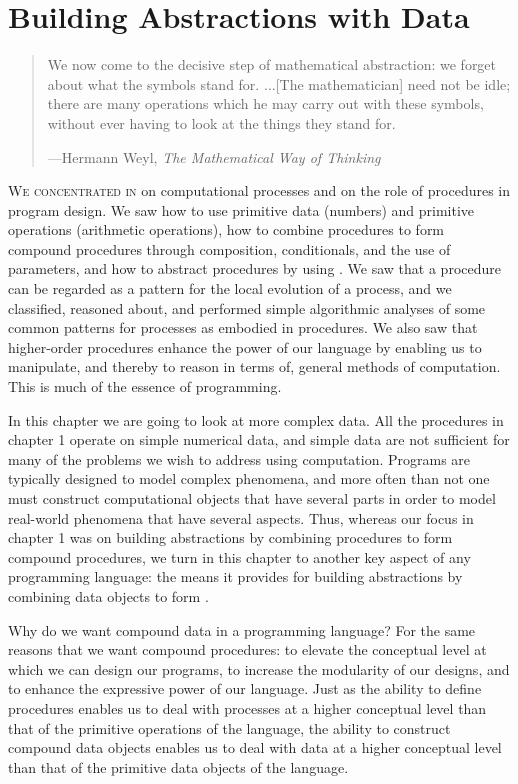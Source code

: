 \chapter{Building Abstractions with Data}
\label{Chapter 2}

\begin{quote}
We now come to the decisive step of mathematical abstraction: we forget about
what the symbols stand for. \( \dots \)[The mathematician] need not be idle; there
are many operations which he may carry out with these symbols, without ever
having to look at the things they stand for.

---Hermann Weyl, \textit{The Mathematical Way of Thinking}
\end{quote}


\noindent
\lettrine[findent=1pt]{W}{e concentrated in}  on computational processes and on the role
of procedures in program design.  We saw how to use primitive data (numbers)
and primitive operations (arithmetic operations), how to combine procedures to
form compound procedures through composition, conditionals, and the use of
parameters, and how to abstract procedures by using .  We saw that
a procedure can be regarded as a pattern for the local evolution of a process,
and we classified, reasoned about, and performed simple algorithmic analyses of
some common patterns for processes as embodied in procedures.  We also saw that
higher-order procedures enhance the power of our language by enabling us to
manipulate, and thereby to reason in terms of, general methods of computation.
This is much of the essence of programming.

In this chapter we are going to look at more complex data.  All the procedures
in chapter 1 operate on simple numerical data, and simple data are not
sufficient for many of the problems we wish to address using computation.
Programs are typically designed to model complex phenomena, and more often than
not one must construct computational objects that have several parts in order
to model real-world phenomena that have several aspects.  Thus, whereas our
focus in chapter 1 was on building abstractions by combining procedures
to form compound procedures, we turn in this chapter to another key aspect of
any programming language: the means it provides for building abstractions by
combining data objects to form .

Why do we want compound data in a programming language?  For the same reasons
that we want compound procedures: to elevate the conceptual level at which we
can design our programs, to increase the modularity of our designs, and to
enhance the expressive power of our language.  Just as the ability to define
procedures enables us to deal with processes at a higher conceptual level than
that of the primitive operations of the language, the ability to construct
compound data objects enables us to deal with data at a higher conceptual level
than that of the primitive data objects of the language.

